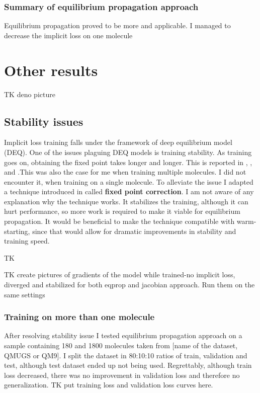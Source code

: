 \documentclass[a4paper,10pt]{report}
\begin{document}
\subsubsection{Summary of equilibrium propagation approach}
Equilibrium propagation proved to be more and applicable. I managed to decrease the implicit loss on one molecule
\section{Other results}

TK deno picture
\subsection{Stability issues}
Implicit loss training falls under the framework of deep equilibrium model (DEQ). One of the issues plaguing DEQ models is training stability. As training goes on, obtaining the fixed point takes longer and longer.  This is reported in \cite{opticalflow}, \cite{bai2021stabilizing}, \cite{burger2025dequify} and \cite{geng2023torchdeq}.This was also the case for me when training multiple molecules. I did not encounter it, when training on a single molecule. To alleviate the issue I adapted a technique introduced in \cite{opticalflow} called \textbf{fixed point correction}. I am not aware of any explanation why the technique works. It stabilizes the training, although it can hurt performance, so more work is required to make it viable for equilibrium propagation.
It would be beneficial to make the technique compatible with warm-starting, since that would allow for dramatic improvements in stability and training speed.


TK

TK create pictures of gradients of the model while trained-no implicit loss, diverged and stabilized for both eqprop and jacobian approach.
Run them on the same settings
\subsubsection{Training on more than one molecule}
After resolving stability issue I tested equilibrium propagation approach on a sample containing 180 and 1800 molecules taken from [name of the dataset, QMUGS or QM9]. I split the dataset in 80:10:10 ratios of train, validation and test, although test dataset ended up not being used. Regrettably, although train loss decreased, there was no improvement in validation loss and therefore no generalization.
TK put training loss and validation loss curves here.
\end{document}
